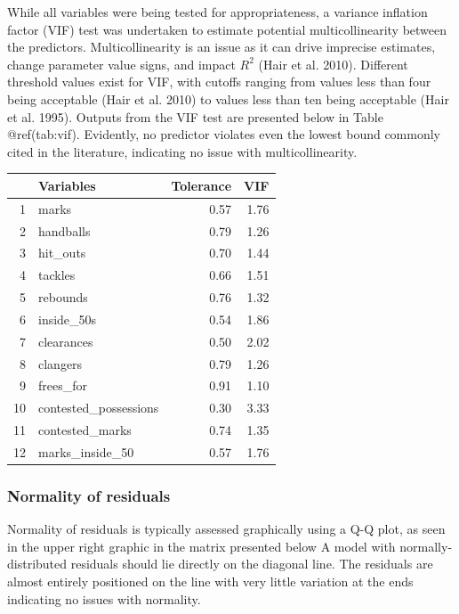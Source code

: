 \documentclass{article}
\begin{document}
While all variables were being tested for appropriateness, a variance
inflation factor (VIF) test was undertaken to estimate potential
multicollinearity between the predictors. Multicollinearity is an issue
as it can drive imprecise estimates, change parameter value signs, and
impact \(R^2\) (Hair et al. 2010). Different threshold values exist for
VIF, with cutoffs ranging from values less than four being acceptable
(Hair et al. 2010) to values less than ten being acceptable (Hair et al.
1995). Outputs from the VIF test are presented below in Table
@ref(tab:vif). Evidently, no predictor violates even the lowest bound
commonly cited in the literature, indicating no issue with
multicollinearity.

\begin{table}[ht]
\centering
\begin{tabular}{rlrr}
  \hline
 & Variables & Tolerance & VIF \\ 
  \hline
1 & marks & 0.57 & 1.76 \\ 
  2 & handballs & 0.79 & 1.26 \\ 
  3 & hit\_outs & 0.70 & 1.44 \\ 
  4 & tackles & 0.66 & 1.51 \\ 
  5 & rebounds & 0.76 & 1.32 \\ 
  6 & inside\_50s & 0.54 & 1.86 \\ 
  7 & clearances & 0.50 & 2.02 \\ 
  8 & clangers & 0.79 & 1.26 \\ 
  9 & frees\_for & 0.91 & 1.10 \\ 
  10 & contested\_possessions & 0.30 & 3.33 \\ 
  11 & contested\_marks & 0.74 & 1.35 \\ 
  12 & marks\_inside\_50 & 0.57 & 1.76 \\ 
   \hline
\end{tabular}
\end{table}

\hypertarget{normality-of-residuals}{%
\subsubsection{Normality of residuals}\label{normality-of-residuals}}

Normality of residuals is typically assessed graphically using a Q-Q
plot, as seen in the upper right graphic in the matrix presented below A
model with normally-distributed residuals should lie directly on the
diagonal line. The residuals are almost entirely positioned on the line
with very little variation at the ends indicating no issues with
normality.
\end{document}
